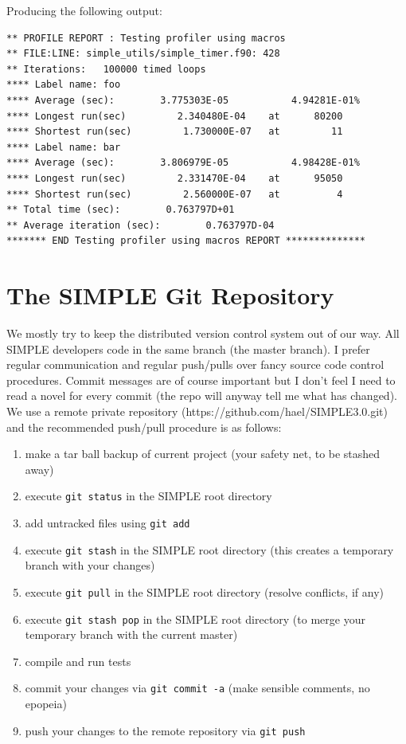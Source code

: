 \documentclass[a4paper,11pt]{article}
\begin{document}
Producing the following output:

\begin{lstlisting}
** PROFILE REPORT : Testing profiler using macros
** FILE:LINE: simple_utils/simple_timer.f90: 428
** Iterations:   100000 timed loops
**** Label name: foo
**** Average (sec):        3.775303E-05           4.94281E-01%
**** Longest run(sec)         2.340480E-04    at      80200
**** Shortest run(sec)         1.730000E-07   at         11
**** Label name: bar
**** Average (sec):        3.806979E-05           4.98428E-01%
**** Longest run(sec)         2.331470E-04    at      95050
**** Shortest run(sec)         2.560000E-07   at          4
** Total time (sec):        0.763797D+01
** Average iteration (sec):        0.763797D-04
******* END Testing profiler using macros REPORT **************
\end{lstlisting}





\section{The SIMPLE Git Repository}
We mostly try to keep the distributed version control system out of our way. All SIMPLE developers code in the same branch (the master branch). I prefer regular communication and regular push/pulls over fancy source code control procedures. Commit messages are of course important but I don't feel I need to read a novel for every commit (the repo will anyway tell me what has changed). We use a remote private repository (https://github.com/hael/SIMPLE3.0.git) and the recommended push/pull procedure is as follows:
\begin{enumerate}
\item make a tar ball backup of current project (your safety net, to be stashed away)
\item execute \texttt{git status} in the SIMPLE root directory
\item add untracked files using \texttt{git add}
\item execute \texttt{git stash} in the SIMPLE root directory (this creates a temporary branch with your changes)
\item execute \texttt{git pull} in the SIMPLE root directory (resolve conflicts, if any)
\item execute \texttt{git stash pop} in the SIMPLE root directory (to merge your temporary branch with the current master)
\item compile and run tests
\item commit your changes via \texttt{git commit -a} (make sensible comments, no epopeia)
\item push your changes to the remote repository via \texttt{git push}
\end{enumerate}
\end{document}
